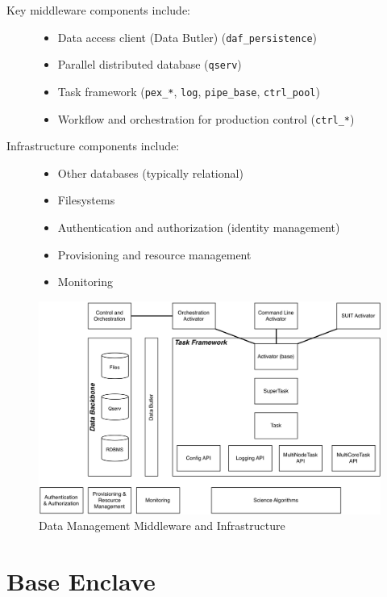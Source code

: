 \documentclass[]{article}
\providecommand{\tightlist}{%
  \setlength{\itemsep}{0pt}\setlength{\parskip}{0pt}}
\begin{document}
\begin{description}
\item[Key middleware components include:]
\begin{itemize}
\tightlist
\item
  Data access client (Data Butler) (\texttt{daf\_persistence})
\item
  Parallel distributed database (\texttt{qserv})
\item
  Task framework (\texttt{pex\_*}, \texttt{log}, \texttt{pipe\_base},
  \texttt{ctrl\_pool})
\item
  Workflow and orchestration for production control (\texttt{ctrl\_*})
\end{itemize}
\item[Infrastructure components include:]
\begin{itemize}
\tightlist
\item
  Other databases (typically relational)
\item
  Filesystems
\item
  Authentication and authorization (identity management)
\item
  Provisioning and resource management
\item
  Monitoring
\end{itemize}
\end{description}

\begin{figure}
\centering
\includegraphics{DM_Middleware_and_Infrastructure.png}
\caption{Data Management Middleware and Infrastructure}
\end{figure}

\section{Base Enclave}\label{base-enclave}
\end{document}
